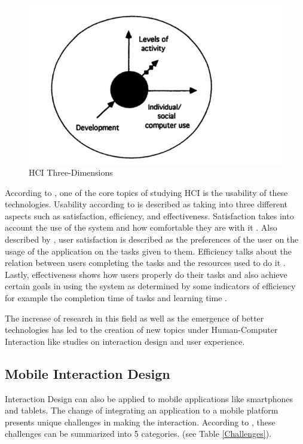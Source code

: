 \begin{figure}[H]
    \centering
    \includegraphics[width=12cm ]{figures/three-dimensions.PNG}
    \caption{HCI Three-Dimensions \protect\cite{kaptelinin1996activity}}
    \label{fig:three_dimensions}
\end{figure}

According to , one of the core topics of studying HCI is the usability of these technologies. Usability according to  is described as taking into three different aspects such as satisfaction, efficiency, and effectiveness. Satisfaction takes into account the use of the system and how comfortable they are with it . Also described by , user satisfaction is described as the preferences of the user on the usage of the application on the tasks given to them. Efficiency talks about the relation between users completing the tasks and the resources used to do it \cite{frokjaer2000measuring}. Lastly, effectiveness shows how users properly do their tasks and also achieve certain goals in using the system as determined by some indicators of efficiency for example the completion time of tasks and learning time \cite{frokjaer2000measuring}.

The increase of research in this field as well as the emergence of better technologies has led to the creation of new topics under Human-Computer Interaction like studies on interaction design and user experience.

\subsection{Mobile Interaction Design} 
Interaction Design can also be applied to mobile applications like smartphones and tablets. The change of integrating an application to a mobile platform presents unique challenges in making the interaction. According to , these challenges can be summarized into 5 categories. (see Table \ref{Challenges}).

